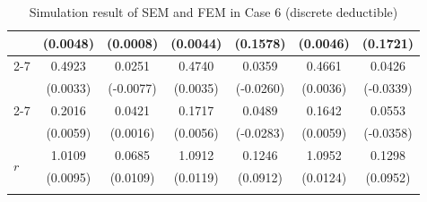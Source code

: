 \begin{table}[!ht]
{{\begin{minipage}{0.65\textwidth}
\begin{tabular}{lcccccc}
         & (0.0048) & (0.0008) & (0.0044) & (0.1578) & (0.0046) & (0.1721) \\
        \cmidrule{2-7}
         & 0.4923 & 0.0251 & 0.4740 & 0.0359 & 0.4661 & 0.0426 \\
         & (0.0033) & (-0.0077) & (0.0035) & (-0.0260) & (0.0036) & (-0.0339) \\
        \cmidrule{2-7}
         & 0.2016 & 0.0421 & 0.1717 & 0.0489 & 0.1642 & 0.0553 \\
         & (0.0059) & (0.0016) & (0.0056) & (-0.0283) & (0.0059) & (-0.0358) \\
        \midrule
        \multirow{2}{*}{$r$} & 1.0109 & 0.0685 & 1.0912 & 0.1246 & 1.0952 & 0.1298 \\
         & (0.0095) & (0.0109) & (0.0119) & (0.0912) & (0.0124) & (0.0952) \\
        \hhline{=======}
        \end{tabular}
    \end{minipage}
}
}
\caption{Simulation result of SEM and FEM in Case 6 (discrete deductible)}\label{tab:AppSimExoCase6}
\end{table}
